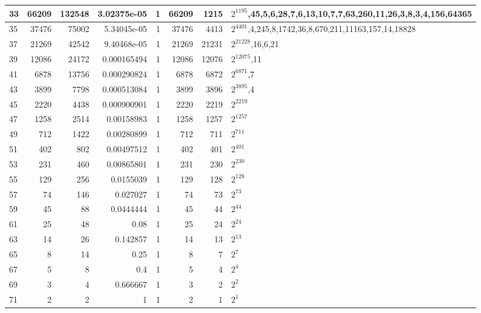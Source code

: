 \documentclass[10pt,a4paper]{standalone}
\begin{document}
\begin{tabular}{l|r|r|r|r|r|r|l|}
33 & 66209 & 132548 & 3.02375e-05 & 1 & 66209 & 1215 & $2^{1195}$,45,5,6,28,7,6,13,10,7,7,63,260,11,26,3,8,3,4,156,64365 \\ \hline
35 & 37476 & 75002 & 5.34045e-05 & 1 & 37476 & 4413 & $2^{4401}$,4,245,8,1742,36,8,670,211,11163,157,14,18828 \\ \hline
37 & 21269 & 42542 & 9.40468e-05 & 1 & 21269 & 21231 & $2^{21228}$,16,6,21 \\ \hline
39 & 12086 & 24172 & 0.000165494 & 1 & 12086 & 12076 & $2^{12075}$,11 \\ \hline
41 & 6878 & 13756 & 0.000290824 & 1 & 6878 & 6872 & $2^{6871}$,7 \\ \hline
43 & 3899 & 7798 & 0.000513084 & 1 & 3899 & 3896 & $2^{3895}$,4 \\ \hline
45 & 2220 & 4438 & 0.000900901 & 1 & 2220 & 2219 & $2^{2219}$ \\ \hline
47 & 1258 & 2514 & 0.00158983 & 1 & 1258 & 1257 & $2^{1257}$ \\ \hline
49 & 712 & 1422 & 0.00280899 & 1 & 712 & 711 & $2^{711}$ \\ \hline
51 & 402 & 802 & 0.00497512 & 1 & 402 & 401 & $2^{401}$ \\ \hline
53 & 231 & 460 & 0.00865801 & 1 & 231 & 230 & $2^{230}$ \\ \hline
55 & 129 & 256 & 0.0155039 & 1 & 129 & 128 & $2^{128}$ \\ \hline
57 & 74 & 146 & 0.027027 & 1 & 74 & 73 & $2^{73}$ \\ \hline
59 & 45 & 88 & 0.0444444 & 1 & 45 & 44 & $2^{44}$ \\ \hline
61 & 25 & 48 & 0.08 & 1 & 25 & 24 & $2^{24}$ \\ \hline
63 & 14 & 26 & 0.142857 & 1 & 14 & 13 & $2^{13}$ \\ \hline
65 & 8 & 14 & 0.25 & 1 & 8 & 7 & $2^{7}$ \\ \hline
67 & 5 & 8 & 0.4 & 1 & 5 & 4 & $2^{4}$ \\ \hline
69 & 3 & 4 & 0.666667 & 1 & 3 & 2 & $2^{2}$ \\ \hline
71 & 2 & 2 & 1 & 1 & 2 & 1 & $2^{1}$ \\ \hline
\end{tabular}
\end{document}
